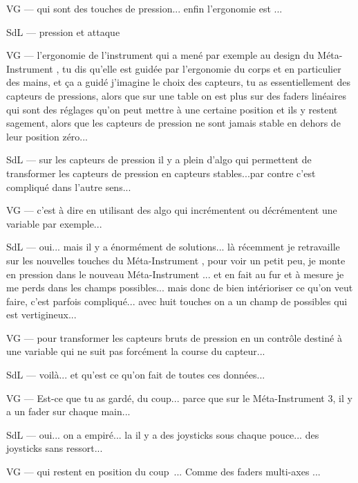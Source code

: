 VG — qui sont des touches de pression... enfin l'ergonomie est ... 

SdL — pression et attaque 

VG — l'ergonomie de l'instrument qui a mené par exemple au design du Méta-Instrument , tu dis qu'elle est guidée par l'ergonomie du corps et en particulier des mains, et ça a guidé j'imagine le choix des capteurs, tu as essentiellement des capteurs de pressions, alors que sur une table on est plus sur des faders linéaires qui sont des réglages qu'on peut mettre à une certaine position et ils y restent sagement, alors que les capteurs de pression ne sont jamais stable en dehors de leur position zéro... 

SdL — sur les capteurs de pression il y a plein d'algo qui permettent de transformer les capteurs de pression en capteurs stables...par contre c'est compliqué dans l'autre sens... 

VG — c'est à dire en utilisant des algo qui incrémentent ou décrémentent une variable par exemple... 

SdL — oui... mais il y a énormément de solutions... là récemment je retravaille sur les nouvelles touches du Méta-Instrument , pour voir un petit peu, je monte en pression dans le nouveau Méta-Instrument ... et en fait au fur et à mesure je me perds dans les champs possibles... mais donc de bien intérioriser ce qu'on veut faire, c'est parfois compliqué... avec huit touches on a un champ de possibles qui est vertigineux... 

VG — pour transformer les capteurs bruts de pression en un contrôle destiné à une variable qui ne suit pas forcément la course du capteur... 

SdL — voilà... et qu'est ce qu'on fait de toutes ces données... 

VG — Est-ce que tu as gardé, du coup... parce que sur le Méta-Instrument 3, il y a un fader sur chaque main... 

SdL — oui... on a empiré... la il y a des joysticks sous chaque pouce... des joysticks sans ressort... 

VG — qui restent en position du coup ... Comme des faders multi-axes ... 

